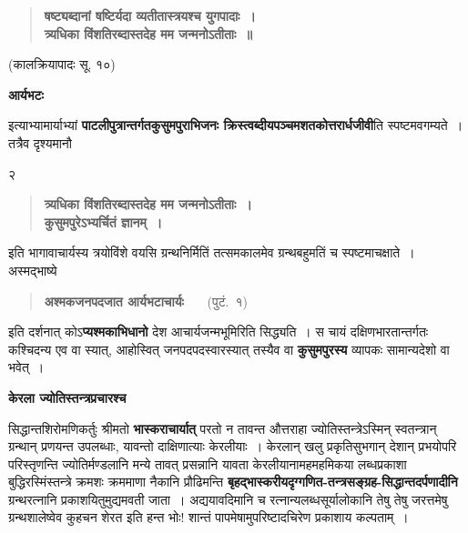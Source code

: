 \documentclass[11pt, openany]{book}
\begin{document}
\begin{quote}
\textbf{षष्ट्यब्दानां षष्टिर्यदा व्यतीतास्त्रयश्च युगपादाः~।\\
त्र्यधिका विंशतिरब्दास्तदेह मम जन्मनोऽतीताः~॥} 
\end{quote}
\vspace{-2mm}
\hspace{7.5cm} (कालक्रियापादः सू. १०) \\

\begin{minipage}[t]{0.10\textwidth}
\vspace{.3cm}
\textbf{आर्यभटः}
\end{minipage} 
\begin{minipage}[t]{0.55\textwidth} 
\noindent इत्याभ्यामार्याभ्यां \textbf{पाटलीपुत्रान्तर्गतकुसुमपुराभिजनः क्रिस्त्वब्दीयपञ्चमशतकोत्तरार्धजीवी}ति स्पष्टमवगम्यते~। तत्रैव दृश्यमानौ\textendash 
\end{minipage}
\newpage

\begin{center}
	२ 
\end{center}
\thispagestyle{empty} 
\begin{quote}
\textbf{त्र्यधिका विंशतिरब्दास्तदेह मम जन्मनोऽतीताः~।\\
कुसुमपुरेऽभ्यर्चितं ज्ञानम्~।}
\end{quote}

\noindent इति भागावाचार्यस्य त्रयोविंशे वयसि ग्रन्थनिर्मितिं तत्समकालमेव ग्रन्थबहुमतिं च स्पष्टमाचक्षाते~। अस्मद्भाष्ये\textendash 

\begin{quote} 
\textbf{अश्मकजनपदजात आर्यभटाचार्यः}~~~ (पुटं.~१)
\end{quote} 
\noindent इति दर्शनात् कोऽ\textbf{प्यश्मकाभिधानो} देश आचार्यजन्मभूमिरिति सिद्ध्यति~। स चायं दक्षिणभारतान्तर्गतः कश्चिदन्य एव वा स्यात्, आहोस्वित् जनपदपदस्वारस्यात् तस्यैव वा \textbf{कुसुमपुरस्य} व्यापकः सामान्यदेशो वा भवेत्~। \\

\begin{minipage}[t]{0.15\textwidth}
\vspace{2cm}
\textbf{ केरला ज्योतिस्तन्त्रप्रचारश्च}
\end{minipage} 
\begin{minipage}[t]{0.55\textwidth} 
सिद्धान्तशिरोमणिकर्तुः श्रीमतो \textbf{भास्कराचार्यात्} परतो न तावन्त औत्तराहा ज्योतिस्तन्त्रेऽस्मिन् स्वतन्त्रान् ग्रन्थान् प्रणयन्त
उपलब्धाः, यावन्तो दाक्षिणात्याः केरलीयाः~। केरलान् खलु प्रकृतिसुभगान् देशान् प्रभयोपरि परिस्तृणन्ति ज्योतिर्मण्डलानि
मन्ये तावत् प्रसन्नानि यावता केरलीयानामहमहमिकया लब्धप्रकाशा बुद्धिरस्मिंस्तन्त्रे क्रमशः क्रममाणा नैकानि प्रौढिमन्ति
\textbf{बृहद्भास्करीयदृग्गणित-तन्त्रसङ्ग्रह-सिद्धान्तदर्पणादीनि} ग्रन्थरत्नानि प्रकाशयितुमुद्यमवती जाता~। अद्ययावदिमानि च रत्नान्यलब्धसूर्यालोकानि तेषु तेषु जरत्तमेषु ग्रन्थशालेष्वेव कुहचन शेरत इति हन्त भोः! शान्तं पापमेषामुपरिष्टादचिरेण प्रकाशाय कल्पताम्~। 
\end{minipage} \vspace{2mm}
\end{document}

